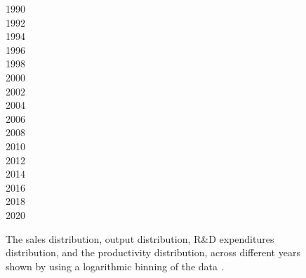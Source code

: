 \begin{figure}[tbp]
\begin{minipage}{0.05\linewidth}
\colorbox{col1!50}{1990} \\
\colorbox{col3!50}{1992} \\
\colorbox{col5!50}{1994} \\
\colorbox{col7!50}{1996} \\
\colorbox{col9!50}{1998} \\
\colorbox{col11!50}{2000} \\
\colorbox{col13!50}{2002} \\
\colorbox{col15!50}{2004} \\
\colorbox{col17!50}{2006} \\
\colorbox{col19!50}{2008} \\
\colorbox{col21!50}{2010} \\
\colorbox{col23!50}{2012} \\
\colorbox{col25!50}{2014} \\
\colorbox{col27!50}{2016} \\
\colorbox{col29!50}{2018} \\
\colorbox{col31!50}{2020} \\
\end{minipage}
\caption{The sales distribution, output distribution, R\&D expenditures distribution, and the productivity distribution, across different years shown by using a logarithmic binning of the data \citep[][]{McManus1987}.}
\label{fig:balance-sheet-distributions}
\end{figure}

